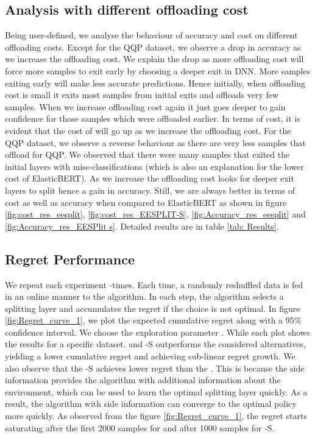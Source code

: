 \subsection{Analysis with different offloading cost}\label{sec:offloading}
Being user-defined, we analyse the behaviour of accuracy and cost on different offloading costs. Except for the QQP dataset, we observe a drop in accuracy as we increase the offloading cost. We explain the drop as more offloading cost will force more samples to exit early by choosing a deeper exit in DNN. More samples exiting early will make less accurate predictions.
Hence initially, when offloading cost is small it exits most samples from initial exits and offloads very few samples. When we increase offloading cost again it just goes deeper to gain confidence for those samples which were offloaded earlier. In terms of cost, it is evident that the cost of \our{} will go up as we increase the offloading cost. For the QQP dataset, we observe a reverse behaviour as there are very less samples that offload for QQP. We observed that there were many samples that exited the initial layers with miss-classifications (which is also an explanation for the lower cost of ElasticBERT).  As we increase the offloading cost \our{} looks for deeper exit layers to split hence a gain in accuracy.
Still, we are always better in terms of cost as well as accuracy when compared to ElasticBERT as shown in figure \ref{fig:cost_res_eesplit}, \ref{fig:cost_res_EESPLIT-S}, \ref{fig:Accuracy_res_eesplit} and \ref{fig:Accuracy_res_EESPlit s}. Detailed results are in table \ref{tab: Results}.









\subsection{Regret Performance}\label{sec: regret}
We repeat each experiment -times. Each time, a randomly reshuffled data is fed in an online manner to the algorithm. 
In each step, the algorithm selects a splitting layer and accumulates the regret if the choice is not optimal. In figure \ref{fig:Regret_curve_1}, we plot the expected cumulative regret along with a 95\% confidence interval. We choose the exploration parameter . While each plot shows the results for a specific dataset. \our{} and \our{}-S outperforms the considered alternatives, yielding a lower cumulative regret and achieving sub-linear regret growth. We also observe that the \our{}-S achieves lower regret than the \our{}. This is because the side information provides the algorithm with additional information about the environment, which can be used to learn the optimal splitting layer quickly. As a result, the algorithm with side information can converge to the optimal policy more quickly. As observed from the figure \ref{fig:Regret_curve_1}, the regret starts saturating after the first 2000 samples for \our{} and after 1000 samples for \our{}-S.
